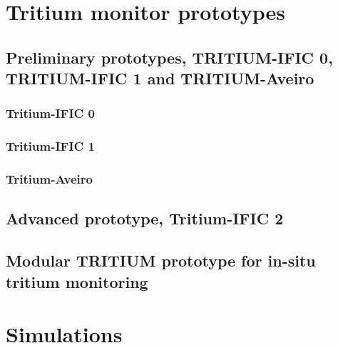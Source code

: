 \documentclass[12pt,a4paper]{book}
\begin{document}
\chapter{Tritium monitor prototypes}\label{chap:Prototypes}	
	
	\section[Preliminary prototypes]{Preliminary prototypes, TRITIUM-IFIC 0, TRITIUM-IFIC 1 and TRITIUM-Aveiro}\label{sec:Preliminary_prototypes}
		\subsection{Tritium-IFIC 0}
		\label{subsec:TritiumIFIC0}
		
		\subsection{Tritium-IFIC 1}
		\label{subsec:TritiumIFIC1}
		
		\subsection{Tritium-Aveiro}
		\label{subsec:TritiumAveiro}
		\newpage
		
	\section[Tritium-IFIC 2]{Advanced prototype, Tritium-IFIC 2}
	\label{sec:TritiumIFIC2}
	\newpage
		
	\section[Modular TRITIUM prototype]{Modular TRITIUM prototype for in-situ tritium monitoring}
	\label{sec:TritiumMonitor}
	\newpage

\chapter{Simulations}  \label{chap:Simulations}
\newpage
	
\end{document}
